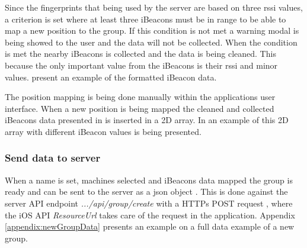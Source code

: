 \bigskip

Since the fingerprints that being used by the server are based on three \acrshort{rssi} values, a criterion is set where at least three iBeacons must be in range to be able to map a new position to the group.
If this condition is not met a warning modal is being showed to the user and the data will not be collected.
When the condition is met the nearby iBeacons is collected and the data is being cleaned.
This because the only important value from the iBeacons is their \acrshort{rssi} and minor values.
 present an example of the formatted iBeacon data.


The position mapping is being done manually within the applications user interface.
When a new position is being mapped the cleaned and collected iBeacons data presented in  is inserted in a 2D array.
In  an example of this 2D array with different iBeacon values is being presented.

\subsubsection{Send data to server}\label{sec:implAppnewGroupSend}
When a name is set, machines selected and iBeacons data mapped the group is ready and can be sent to the server as a \acrfull{json} object \cite{IntroducingJSON}.
This is done against the server API endpoint \textit{.../api/group/create} with a HTTPs POST request \cite{POSTHTTPMDN}, where the iOS API \textit{ResourceUrl} \cite{ResourceURLAppleDeveloper} takes care of the request in the application.
Appendix \ref{appendix:newGroupData} presents an example on a full data example of a new group.
